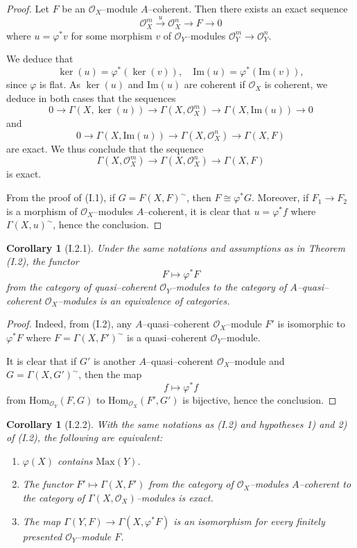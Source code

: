 \documentclass[a4paper]{amsart}
\newtheorem{cor}[theorem]{Corollary}
\theoremstyle{definition}
\theoremstyle{definition}
\begin{document}
\begin{proof}
Let $F$ be an $\mathcal{O}_X$–module $A$–coherent. Then there exists an exact sequence
\[
\mathcal{O}_X^m \xrightarrow{u} \mathcal{O}_X^n \longrightarrow F \longrightarrow 0
\]
where $u = \varphi^* v$ for some morphism $v$ of $\mathcal{O}_Y$–modules $\mathcal{O}_Y^m \to \mathcal{O}_Y^n$.  

We deduce that
\[
\ker(u) = \varphi^*(\ker(v)), \quad \mathrm{Im}(u) = \varphi^*(\mathrm{Im}(v)),
\]
since $\varphi$ is flat. As $\ker(u)$ and $\mathrm{Im}(u)$ are coherent if $\mathcal{O}_X$ is coherent, we deduce in both cases that the sequences
\[
0 \to \Gamma(X, \ker(u)) \to \Gamma(X, \mathcal{O}_X^m) \to \Gamma(X, \mathrm{Im}(u)) \to 0
\]
and
\[
0 \to \Gamma(X, \mathrm{Im}(u)) \to \Gamma(X, \mathcal{O}_X^n) \to \Gamma(X, F)
\]
are exact. We thus conclude that the sequence
\[
\Gamma(X, \mathcal{O}_X^m) \to \Gamma(X, \mathcal{O}_X^n) \to \Gamma(X, F)
\]
is exact.

From the proof of (I.1), if $G = F(X, F)^\sim$, then $F \cong \varphi^* G$. Moreover, if $F_1 \to F_2$ is a morphism of $\mathcal{O}_X$–modules $A$–coherent, it is clear that $u = \varphi^* f$ where $\Gamma(X, u)^\sim$, hence the conclusion.
\end{proof}

\begin{cor}[I.2.1]
Under the same notations and assumptions as in Theorem (I.2), the functor
\[
F \longmapsto \varphi^* F
\]
from the category of quasi–coherent $\mathcal{O}_Y$–modules to the category of $A$–quasi–coherent $\mathcal{O}_X$–modules is an equivalence of categories.
\end{cor}

\begin{proof}
Indeed, from (I.2), any $A$–quasi–coherent $\mathcal{O}_X$–module $F'$ is isomorphic to $\varphi^* F$ where $F = \Gamma(X, F')^\sim$ is a quasi–coherent $\mathcal{O}_Y$–module.  

It is clear that if $G'$ is another $A$–quasi–coherent $\mathcal{O}_X$–module and $G = \Gamma(X, G')^\sim$, then the map
\[
f \mapsto \varphi^* f
\]
from $\mathrm{Hom}_{\mathcal{O}_Y}(F, G)$ to $\mathrm{Hom}_{\mathcal{O}_X}(F', G')$ is bijective, hence the conclusion.
\end{proof}

\begin{cor}[I.2.2]
With the same notations as (I.2) and hypotheses 1) and 2) of (I.2), the following are equivalent:
\begin{enumerate}
\item[(3)] $\varphi(X)$ contains $\mathrm{Max}(Y)$.
\item[(i)] The functor $F' \mapsto \Gamma(X, F')$ from the category of $\mathcal{O}_X$–modules $A$–coherent to the category of $\Gamma(X, \mathcal{O}_X)$–modules is exact.
\item[(ii)] The map $\Gamma(Y, F) \to \Gamma(X, \varphi^* F)$ is an isomorphism for every finitely presented $\mathcal{O}_Y$–module $F$.
\end{enumerate}
\end{cor}
\end{document}

